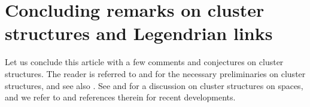 \documentclass[10pt]{amsart}
\theoremstyle{plain}
\theoremstyle{definition}
\theoremstyle{remark}
\numberwithin{equation}{section}
\newcommand{\lr}{\longrightarrow}
\newcommand{\bC}{\mathbb{C}}
\newcommand{\MG}[1]{{\color{teal}{{\bf Misha}: #1}}}
\DeclareRobustCommand{\ateb}{\text{\reflectbox{$\beta$}}}
\begin{document}

\section{Concluding remarks on cluster structures and Legendrian links}
\label{sec:cluster}


Let us conclude this article with a few comments and conjectures on cluster structures. The reader is referred to \cite{FominZelevinsky_ClusterI,FominZelevinsky_ClusterII} and \cite{FockGoncharov_ModuliLocSys,FockGoncharovII} for the necessary preliminaries on cluster structures, and see also \cite{FG,Fraser, GHKK, LS, Mills, Muller, MS,Qin}. See \cite[Section 2.8]{CasalsWeng22} and \cite[Section 6]{FWZ} %
for a discussion on cluster structures on spaces, and we refer to \cite{CasalsHonghao,CG23}  and references therein for recent developments.\\
\end{document}
